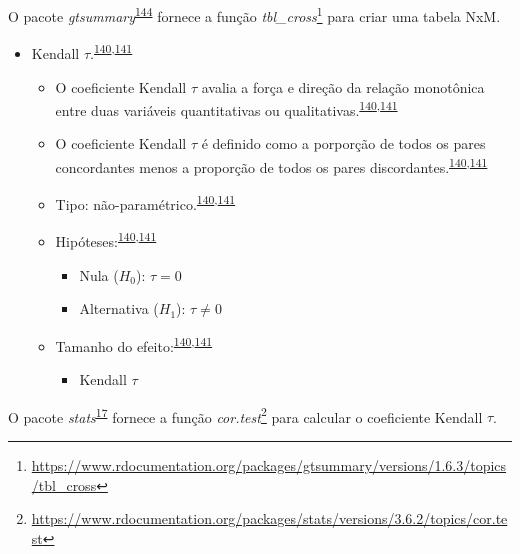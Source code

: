 \documentclass[
]{book}
\providecommand{\tightlist}{%
  \setlength{\itemsep}{0pt}\setlength{\parskip}{0pt}}
\renewcommand{\href}[2]{#2\footnote{\url{#1}}}
\newenvironment{infobox}[1]
  {
  \begin{itemize}
  \renewcommand{\labelitemi}{
    \raisebox{-.7\height}[0pt][0pt]{
      {\setkeys{Gin}{width=3em,keepaspectratio}
        \texttt{[image: \#1]}}
    }
  }
  \setlength{\fboxsep}{1em}
  \begin{blackbox}
  \item
  }
  {
  \end{blackbox}
  \end{itemize}
  }
\begin{document}
\begin{infobox}{images/Rlogo}
O pacote \emph{gtsummary}\textsuperscript{\protect\hyperlink{ref-gtsummary}{144}} fornece a função \href{https://www.rdocumentation.org/packages/gtsummary/versions/1.6.3/topics/tbl_cross}{\emph{tbl\_cross}} para criar uma tabela NxM.

\end{infobox}

\begin{itemize}
\item
  Kendall \(\tau\).\textsuperscript{\protect\hyperlink{ref-khamis2008}{140},\protect\hyperlink{ref-allison2022}{141}}

  \begin{itemize}
  \item
    O coeficiente Kendall \(\tau\) avalia a força e direção da relação monotônica entre duas variáveis quantitativas ou qualitativas.\textsuperscript{\protect\hyperlink{ref-khamis2008}{140},\protect\hyperlink{ref-allison2022}{141}}
  \item
    O coeficiente Kendall \(\tau\) é definido como a porporção de todos os pares concordantes menos a proporção de todos os pares discordantes.\textsuperscript{\protect\hyperlink{ref-khamis2008}{140},\protect\hyperlink{ref-allison2022}{141}}
  \item
    Tipo: não-paramétrico.\textsuperscript{\protect\hyperlink{ref-khamis2008}{140},\protect\hyperlink{ref-allison2022}{141}}
  \item
    Hipóteses:\textsuperscript{\protect\hyperlink{ref-khamis2008}{140},\protect\hyperlink{ref-allison2022}{141}}

    \begin{itemize}
    \item
      Nula (\(H_{0}\)): \(\tau=0\)
    \item
      Alternativa (\(H_{1}\)): \(\tau≠0\)
    \end{itemize}
  \item
    Tamanho do efeito:\textsuperscript{\protect\hyperlink{ref-khamis2008}{140},\protect\hyperlink{ref-allison2022}{141}}

    \begin{itemize}
    \tightlist
    \item
      Kendall \(\tau\)
    \end{itemize}
  \end{itemize}
\end{itemize}

\begin{infobox}{images/Rlogo}
O pacote \emph{stats}\textsuperscript{\protect\hyperlink{ref-stats-2}{17}} fornece a função \href{https://www.rdocumentation.org/packages/stats/versions/3.6.2/topics/cor.test}{\emph{cor.test}} para calcular o coeficiente Kendall \(\tau\).

\end{infobox}
\end{document}
